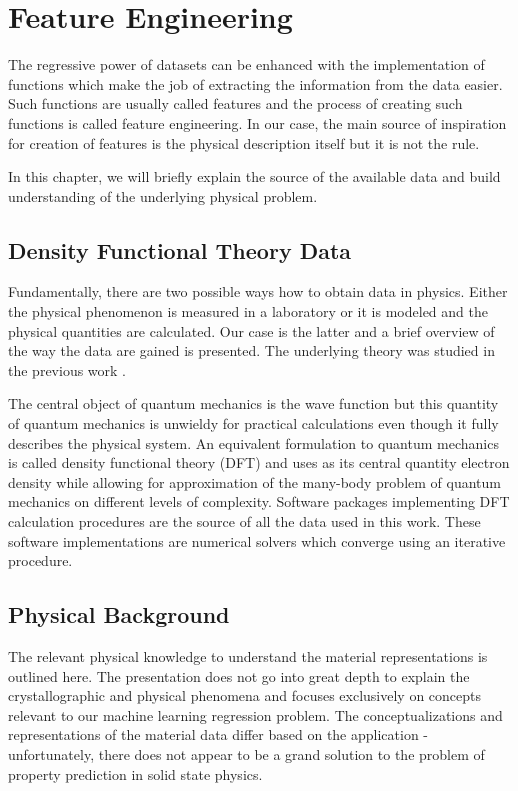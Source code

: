 \documentclass[11pt,oneside,czech,american]{book} %
\theoremstyle{definition} %
\theoremstyle{definition}
\begin{document}
\chapter{Feature Engineering}\label{feature_engineering}
The regressive power of datasets can be enhanced with the implementation of functions which make the job of extracting the information from the data easier. Such functions are usually called features and the process of creating such functions is called feature engineering. In our case, the main source of inspiration for creation of features is the physical description itself but it is not the rule.

In this chapter, we will briefly explain the source of the available data and build understanding of the underlying physical problem.
\section{Density Functional Theory Data} \label{DFT}
Fundamentally, there are two possible ways how to obtain data in physics. Either the physical phenomenon is measured in a laboratory or it is modeled and the physical quantities are calculated. Our case is the latter and a brief overview of the way the data are gained is presented. The underlying theory was studied in the previous work \parencite{jurka}.

The central object of quantum mechanics is the wave function but this quantity of quantum mechanics is unwieldy for practical calculations even though it fully describes the physical system. An equivalent formulation to quantum mechanics is called density functional theory (DFT) and uses as its central quantity electron density while allowing for approximation of the many-body problem of quantum mechanics on different levels of complexity. Software packages implementing DFT calculation procedures are the source of all the data used in this work. These software implementations are numerical solvers which converge using an iterative procedure.


\section{Physical Background} \label{physical}
The relevant physical knowledge to understand the material representations is outlined here. The presentation does not go into great depth to explain the crystallographic and physical phenomena and focuses exclusively on concepts relevant to our machine learning regression problem. The conceptualizations and representations of the material data differ based on the application - unfortunately, there does not appear to be a grand solution to the problem of property prediction in solid state physics.
\end{document}
